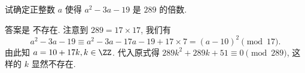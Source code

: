 \begin{prob}
\label{prob:prob-4}
试确定正整数 $a$ 使得 $a^2 - 3a - 19$ 是 $289$ 的倍数.
\end{prob}

\begin{soln}
答案是 $\boxed{\text{不存在.}}$ 注意到 $289 = 17 \times 17$, 我们有
\begin{equation}
\label{eq:1}
a^2 - 3a - 19 \equiv a^2 - 3a - 17a - 19 + 17 \times 7
               = (a - 10)^2 \pmod{17}.
\end{equation}
由此知 $a = 10 + 17k, k \in \ZZ$.
代入原式得 $289k^2 + 289k + 51 \equiv 0 \pmod{289}$,
这样的 $k$ 显然不存在.
\end{soln}
